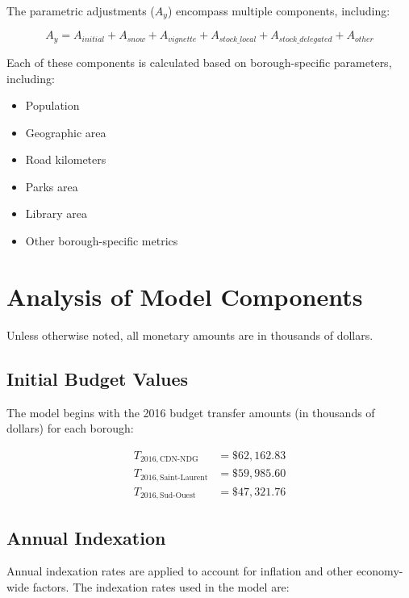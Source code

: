 \documentclass{article}
\begin{document}
The parametric adjustments ($A_y$) encompass multiple components, including:

\begin{equation}
A_y = A_{initial} + A_{snow} + A_{vignette} + A_{stock\_local} + A_{stock\_delegated} + A_{other}
\end{equation}

Each of these components is calculated based on borough-specific parameters, including:
\begin{itemize}
    \item Population
    \item Geographic area
    \item Road kilometers
    \item Parks area
    \item Library area
    \item Other borough-specific metrics
\end{itemize}

\section{Analysis of Model Components}

Unless otherwise noted, all monetary amounts are in thousands of dollars.

\subsection{Initial Budget Values}

The model begins with the 2016 budget transfer amounts (in thousands of dollars) for each borough:

\begin{equation}
\begin{aligned}
T_{2016,\text{CDN-NDG}} &= \$62,162.83 \\
T_{2016,\text{Saint-Laurent}} &= \$59,985.60 \\
T_{2016,\text{Sud-Ouest}} &= \$47,321.76
\end{aligned}
\end{equation}

\subsection{Annual Indexation}

Annual indexation rates are applied to account for inflation and other economy-wide factors. The indexation rates used in the model are:
\end{document}
